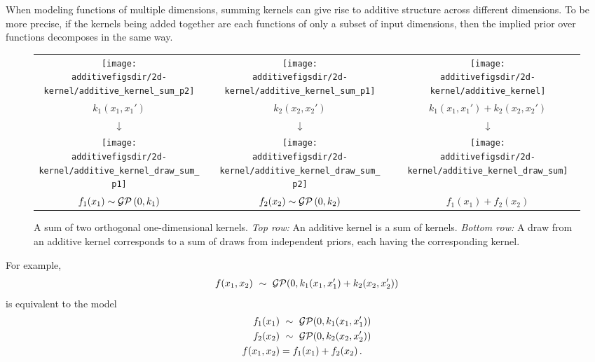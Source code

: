 When modeling functions of multiple dimensions, summing kernels can give rise to additive structure across different dimensions.
To be more precise, if the kernels being added together are each functions of only a subset of input dimensions, then the implied prior over functions decomposes in the same way.
%
\begin{figure}
\centering
\begin{tabular}{ccccc}
\hspace{-0.2cm}\texttt{[image: \\additivefigsdir/2d-kernel/additive\_kernel\_sum\_p2]} 
& \hspace{-0.4cm} \raisebox{1cm}{+} \hspace{-0.4cm} & 
\texttt{[image: \\additivefigsdir/2d-kernel/additive\_kernel\_sum\_p1]} 
& \hspace{-0.4cm} \raisebox{1cm}{=} \hspace{-0.4cm} & 
\texttt{[image: \\additivefigsdir/2d-kernel/additive\_kernel]} \\
$k_1(x_1, x_1')$ & & $k_2(x_2, x_2')$ & & $k_1(x_1,x_1') + k_2(x_2,x_2')$ \\[1em]
\large $\downarrow$ & & \large $\downarrow$ & & \large $\downarrow$ \\[-0.2em]
\hspace{-0.2cm}\texttt{[image: \\additivefigsdir/2d-kernel/additive\_kernel\_draw\_sum\_p1]}
& \hspace{-0.4cm} \raisebox{1cm}{+} \hspace{-0.4cm} & 
\texttt{[image: \\additivefigsdir/2d-kernel/additive\_kernel\_draw\_sum\_p2]}
& \hspace{-0.4cm} \raisebox{1cm}{=} \hspace{-0.4cm} &
\texttt{[image: \\additivefigsdir/2d-kernel/additive\_kernel\_draw\_sum]} \\
$f_1(x_1) \sim \mathcal{GP}\left(0, k_1\right)$ & & $f_2(x_2) \sim \mathcal{GP}\left(0, k_2\right)$ & & $f_1(x_1) + f_2(x_2)$ \\[1em]
\end{tabular}
\caption[Additive kernels correspond to additive functions]{
A sum of two orthogonal one-dimensional kernels.
\emph{Top row:} An additive kernel is a sum of kernels.
\emph{Bottom row:} A draw from an additive kernel corresponds to a sum of draws from independent \gp{} priors, each having the corresponding kernel.
}
\label{fig:sum-of-kernels}
\end{figure}
%
For example,
%
\begin{align}
f(x_1, x_2) \ \sim\  \mathcal{GP}(0, k_1(x_1, x_1') + k_2(x_2, x_2'))
\end{align}
%
is equivalent to the model
%
\begin{align}
f_1(x_1) & \ \sim\  \mathcal{GP}(0, k_1(x_1, x_1'))\\
f_2(x_2) & \ \sim\  \mathcal{GP}(0, k_2(x_2, x_2'))\\
f(x_1, x_2) & = f_1(x_1) + f_2(x_2) \, .
\end{align}
%
%

